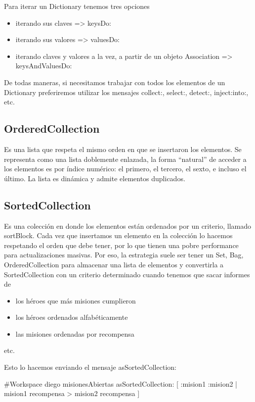 \documentclass[a4paper,12pt]{book}
\begin{document}
Para iterar un Dictionary tenemos tres opciones

\begin{itemize}
 \item iterando sus claves => keysDo:
 \item iterando sus valores => valuesDo:
 \item iterando claves y valores a la vez, a partir de un objeto Association => 
 keysAndValuesDo:
\end{itemize}

De todas maneras, si necesitamos trabajar con todos los elementos de un Dictionary preferiremos utilizar
los mensajes collect:, select:, detect:, inject:into:, etc.

\subsection{OrderedCollection}

Es una lista que respeta el mismo orden en que se insertaron los elementos. Se representa como una lista
doblemente enlazada, la forma ``natural'' de acceder a los elementos es por índice numérico: el primero, 
el tercero, el sexto, e incluso el último. La lista es dinámica y admite elementos duplicados. 

\subsection{SortedCollection}

Es una colección en donde los elementos están ordenados por un criterio, llamado sortBlock. Cada vez que
insertamos un elemento en la colección lo hacemos respetando el orden que debe tener, por lo que tienen
una pobre performance para actualizaciones masivas. Por eso, la estrategia suele ser tener un Set, Bag,
OrderedCollection para almacenar una lista de elementos y convertirla a SortedCollection con un criterio
determinado cuando tenemos que sacar informes de

\begin{itemize}
 \item los héroes que más misiones cumplieron
 \item los héroes ordenados alfabéticamente
 \item las misiones ordenadas por recompensa
\end{itemize}
etc. 

Esto lo hacemos enviando el mensaje asSortedCollection:

\begin{code}
#Workspace
diego misionesAbiertas asSortedCollection: 
    [ :mision1 :mision2 | mision1 recompensa > mision2 recompensa ]
\end{code}
\end{document}
